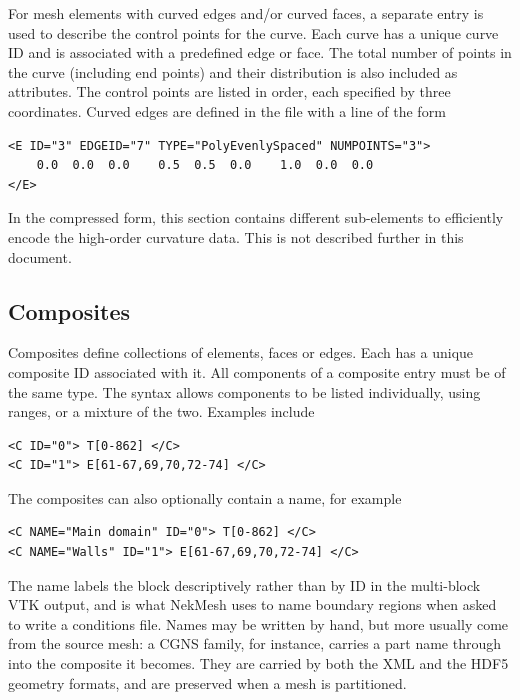 For mesh elements with curved edges and/or curved faces, a separate entry is used to describe the control points for the curve. Each curve has a unique curve ID and is associated with a predefined edge or face. The total number of points in the curve (including end points) and their distribution is also included as attributes. The control points are listed in order, each specified by three coordinates. Curved edges are defined in the file with a line of the form
\begin{lstlisting}[style=XMLStyle]
<E ID="3" EDGEID="7" TYPE="PolyEvenlySpaced" NUMPOINTS="3">
    0.0  0.0  0.0    0.5  0.5  0.0    1.0  0.0  0.0
</E>
\end{lstlisting}

\begin{notebox}
    In the compressed form, this section contains different sub-elements to
    efficiently encode the high-order curvature data. This is not described
    further in this document.
\end{notebox}

\subsection{Composites}
\label{sec:xml:composites}
Composites define collections of elements, faces or edges. Each has a unique composite ID associated with it. All components of a composite entry must be of the same type. The syntax allows components to be listed individually, using ranges, or a mixture of the two. Examples include
\begin{lstlisting}[style=XMLStyle]
<C ID="0"> T[0-862] </C>
<C ID="1"> E[61-67,69,70,72-74] </C>
\end{lstlisting}

The composites can also optionally contain a name, for example
\begin{lstlisting}[style=XMLStyle]
<C NAME="Main domain" ID="0"> T[0-862] </C>
<C NAME="Walls" ID="1"> E[61-67,69,70,72-74] </C>
\end{lstlisting}

The name labels the block descriptively rather than by ID in the multi-block
VTK output, and is what NekMesh uses to name boundary regions when asked to
write a conditions file. Names may be written by hand, but more usually come
from the source mesh: a CGNS family, for instance, carries a part name through
into the composite it becomes. They are carried by both the XML and the HDF5
geometry formats, and are preserved when a mesh is partitioned.

